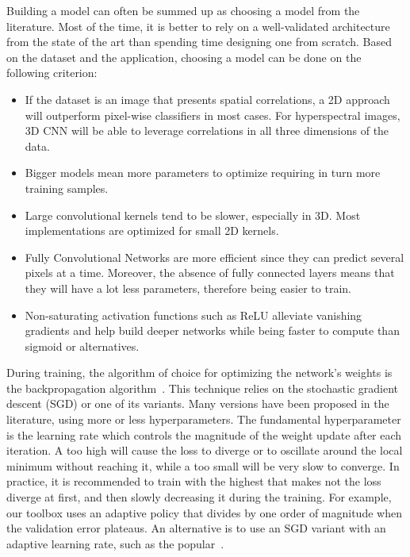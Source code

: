 \documentclass[journal]{IEEEtran}
\begin{document}
Building a model can often be summed up as choosing a model from the literature. Most of the time, it is better to rely on a well-validated architecture from the state of the art than spending time designing one from scratch. Based on the dataset and the application, choosing a model can be done on the following criterion:
\begin{itemize}
	\item If the dataset is an image that presents spatial correlations, a 2D approach will outperform pixel-wise classifiers in most cases. For hyperspectral images, 3D CNN will be able to leverage correlations in all three dimensions of the data.
    \item Bigger models mean more parameters to optimize requiring in turn more training samples.
    \item Large convolutional kernels tend to be slower, especially in 3D. Most implementations are optimized for small 2D kernels.
    \item Fully Convolutional Networks are more efficient since they can predict several pixels at a time. Moreover, the absence of fully connected layers means that they will have a lot less parameters, therefore being easier to train.
    \item Non-saturating activation functions such as ReLU alleviate vanishing gradients and help build deeper networks while being faster to compute than sigmoid or  alternatives.
\end{itemize}

During training, the algorithm of choice for optimizing the network's weights is the backpropagation algorithm~\cite{lecun_backpropagation_1989}. This technique relies on the stochastic gradient descent (SGD) or one of its variants. Many versions have been proposed in the literature, using more or less hyperparameters. The fundamental hyperparameter is the learning rate  which controls the magnitude of the weight update after each iteration. A too high  will cause the loss to diverge or to oscillate around the local minimum without reaching it, while a too small  will be very slow to converge. In practice, it is recommended to train with the highest  that makes not the loss diverge at first, and then slowly decreasing it during the training. For example, our toolbox uses an adaptive policy that divides  by one order of magnitude when the validation error plateaus. An alternative is to use an SGD variant with an adaptive learning rate, such as the popular~\cite{kingma_adam:_2015}.
\end{document}
